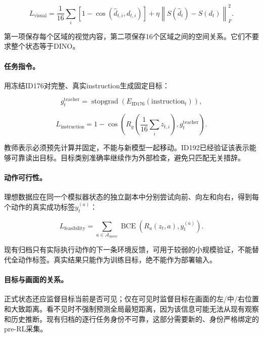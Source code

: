 \documentclass[UTF8,11pt,a4paper,fontset=none]{ctexart}
\begin{document}
\begin{equation}
  L_{\mathrm{visual}}
  =\frac{1}{16}\sum_i\left[1-\cos(\hat d_{t,i},d_{t,i})\right]
  +\eta\left\|S(\hat d_t)-S(d_t)\right\|_F^2.
\end{equation}

第一项保存每个区域的视觉内容，第二项保存16个区域之间的空间关系。它们不要求整个状态等于DINO。

\paragraph{任务指令。}
用冻结ID176对完整、真实instruction生成固定目标：

\begin{equation}
  g_t^{\mathrm{teacher}}
  =\operatorname{stopgrad}\!\left(E_{\mathrm{ID176}}(\mathrm{instruction}_t)\right),
\end{equation}

\begin{equation}
  L_{\mathrm{instruction}}
  =1-\cos\!\left(
  R_g\!\left(\frac{1}{16}\sum_i z_{t,i}\right),
  g_t^{\mathrm{teacher}}
  \right).
\end{equation}

教师表示必须预先计算并固定，不能与新模型一起移动。ID192已经验证该表示能够可靠读出目标。目标类别准确率继续作为外部检查，避免只匹配无关措辞。

\paragraph{动作可行性。}
理想数据应在同一个模拟器状态的独立副本中分别尝试向前、向左和向右，得到每个动作的真实成功标签$y_t^{(a)}$：

\begin{equation}
  L_{\mathrm{feasibility}}
  =\sum_{a\in\mathcal A_{\mathrm{move}}}
  \operatorname{BCE}\!\left(R_a(z_t,a),y_t^{(a)}\right).
\end{equation}

现有归档只有实际执行动作的下一条环境反馈，可用于较弱的小规模验证，不能替代全动作标签。真实结果只能作为训练目标，绝不能作为部署输入。

\paragraph{目标与画面的关系。}
正式状态还应监督目标当前是否可见；仅在可见时监督目标在画面的左/中/右位置和大致距离。看不见时不强制预测全局最短距离，因为该信息可能无法从现有观察和历史推断。现有归档的逐行任务身份不可靠，这部分需要新的、身份严格绑定的pre-RL采集。
\end{document}
